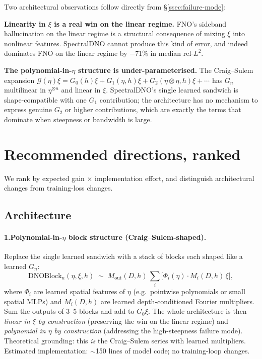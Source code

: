 \documentclass[11pt,letterpaper]{article}
\newcommand{\Gop}{\mathcal{G}}
\begin{document}
Two architectural observations follow directly from \S\ref{ssec:failure-mode}:

\textbf{Linearity in $\xi$ is a real win on the linear regime.} FNO's
sideband hallucination on the linear regime is a structural
consequence of mixing $\xi$ into nonlinear features. SpectralDNO cannot
produce this kind of error, and indeed dominates FNO on the linear
regime by $-71\%$ in median rel-$L^{2}$.

\textbf{The polynomial-in-$\eta$ structure is under-parameterised.}
The Craig--Sulem expansion
$\Gop(\eta)\xi = G_{0}(h)\xi + G_{1}(\eta,h)\xi + G_{2}(\eta\otimes
\eta,h)\xi + \cdots$
has $G_{n}$ multilinear in $\eta^{\otimes n}$ and linear in $\xi$.
SpectralDNO's single learned sandwich is shape-compatible with one
$G_{1}$ contribution; the architecture has no mechanism to express
genuine $G_{2}$ or higher contributions, which are exactly the terms
that dominate when steepness or bandwidth is large.

\section{Recommended directions, ranked}

We rank by expected gain $\times$ implementation effort, and
distinguish architectural changes from training-loss changes.

\subsection{Architecture}

\paragraph{1.\;Polynomial-in-$\eta$ block structure (Craig--Sulem-shaped).}
Replace the single learned sandwich with a stack of blocks each shaped
like a learned $G_{n}$:
\[
  \text{DNOBlock}_{n}(\eta,\xi,h)
  \;\sim\; M_{\mathrm{out}}(D,h)\,
  \sum_{i}\bigl[\Phi_{i}(\eta)\cdot M_{i}(D,h)\,\xi\bigr],
\]
where $\Phi_{i}$ are learned spatial features of $\eta$ (e.g.\ pointwise
polynomials or small spatial MLPs) and $M_{i}(D,h)$ are learned
depth-conditioned Fourier multipliers. Sum the outputs of 3--5 blocks
and add to $G_{0}\xi$. The whole architecture is then \emph{linear in
$\xi$ by construction} (preserving the win on the linear regime) and
\emph{polynomial in $\eta$ by construction} (addressing the
high-steepness failure mode). Theoretical grounding: this \emph{is} the
Craig--Sulem series with learned multipliers. Estimated implementation:
$\sim$150 lines of model code; no training-loop changes.
\end{document}
